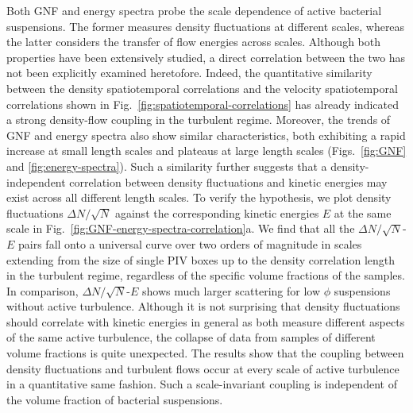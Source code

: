\documentclass[twocolumn,aps,prx,amsmath,amssymb,longbibliography]{revtex4-2}
\begin{document}
Both GNF and energy spectra probe the scale dependence of active bacterial suspensions. The former measures density fluctuations at different scales, whereas the latter considers the transfer of flow energies across scales. Although both properties have been extensively studied, a direct correlation between the two has not been explicitly examined heretofore. Indeed, the quantitative similarity between the density spatiotemporal correlations and the velocity spatiotemporal correlations shown in Fig.~\ref{fig:spatiotemporal-correlations} has already indicated a strong density-flow coupling in the turbulent regime. Moreover, the trends of GNF and energy spectra also show similar characteristics, both exhibiting a rapid increase at small length scales and plateaus at large length scales (Figs.~\ref{fig:GNF} and \ref{fig:energy-spectra}). Such a similarity further suggests that a density-independent correlation between density fluctuations and kinetic energies may exist across all different length scales. To verify the hypothesis, we plot density fluctuations $\Delta N/\sqrt N$ against the corresponding kinetic energies $E$ at the same scale in Fig.~\ref{fig:GNF-energy-spectra-correlation}a. We find that all the $\Delta N/\sqrt N$-$E$ pairs fall onto a universal curve over two orders of magnitude in scales extending from the size of single PIV boxes up to the density correlation length in the turbulent regime, regardless of the specific volume fractions of the samples.
In comparison, $\Delta N/\sqrt N$-$E$ shows much larger scattering for low $\phi$ suspensions without active turbulence. Although it is not surprising that density fluctuations should correlate with kinetic energies in general as both measure different aspects of the same active turbulence, the collapse of data from samples of different volume fractions is quite unexpected.
The results show that the coupling between density fluctuations and turbulent flows occur at every scale of active turbulence in a quantitative same fashion. Such a scale-invariant coupling is independent of the volume fraction of bacterial suspensions.
\end{document}
